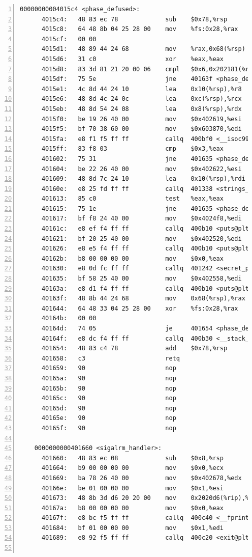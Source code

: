 \documentclass{article}
\begin{document}
\begin{lstlisting}[title = bomb的反汇编代码及部分注释, xleftmargin = 2em,xrightmargin = 2em, aboveskip = 1em, numbers = left, basicstyle=\scriptsize\ttfamily, numberstyle=\scriptsize]
    00000000004015c4 <phase_defused>:
      4015c4:	48 83 ec 78          	sub    $0x78,%rsp
      4015c8:	64 48 8b 04 25 28 00 	mov    %fs:0x28,%rax
      4015cf:	00 00 
      4015d1:	48 89 44 24 68       	mov    %rax,0x68(%rsp)
      4015d6:	31 c0                	xor    %eax,%eax
      4015d8:	83 3d 81 21 20 00 06 	cmpl   $0x6,0x202181(%rip)        # 603760 <num_input_strings>
      4015df:	75 5e                	jne    40163f <phase_defused+0x7b>
      4015e1:	4c 8d 44 24 10       	lea    0x10(%rsp),%r8
      4015e6:	48 8d 4c 24 0c       	lea    0xc(%rsp),%rcx
      4015eb:	48 8d 54 24 08       	lea    0x8(%rsp),%rdx
      4015f0:	be 19 26 40 00       	mov    $0x402619,%esi
      4015f5:	bf 70 38 60 00       	mov    $0x603870,%edi
      4015fa:	e8 f1 f5 ff ff       	callq  400bf0 <__isoc99_sscanf@plt>
      4015ff:	83 f8 03             	cmp    $0x3,%eax
      401602:	75 31                	jne    401635 <phase_defused+0x71>
      401604:	be 22 26 40 00       	mov    $0x402622,%esi
      401609:	48 8d 7c 24 10       	lea    0x10(%rsp),%rdi
      40160e:	e8 25 fd ff ff       	callq  401338 <strings_not_equal>
      401613:	85 c0                	test   %eax,%eax
      401615:	75 1e                	jne    401635 <phase_defused+0x71>
      401617:	bf f8 24 40 00       	mov    $0x4024f8,%edi
      40161c:	e8 ef f4 ff ff       	callq  400b10 <puts@plt>
      401621:	bf 20 25 40 00       	mov    $0x402520,%edi
      401626:	e8 e5 f4 ff ff       	callq  400b10 <puts@plt>
      40162b:	b8 00 00 00 00       	mov    $0x0,%eax
      401630:	e8 0d fc ff ff       	callq  401242 <secret_phase>
      401635:	bf 58 25 40 00       	mov    $0x402558,%edi
      40163a:	e8 d1 f4 ff ff       	callq  400b10 <puts@plt>
      40163f:	48 8b 44 24 68       	mov    0x68(%rsp),%rax
      401644:	64 48 33 04 25 28 00 	xor    %fs:0x28,%rax
      40164b:	00 00 
      40164d:	74 05                	je     401654 <phase_defused+0x90>
      40164f:	e8 dc f4 ff ff       	callq  400b30 <__stack_chk_fail@plt>
      401654:	48 83 c4 78          	add    $0x78,%rsp
      401658:	c3                   	retq   
      401659:	90                   	nop
      40165a:	90                   	nop
      40165b:	90                   	nop
      40165c:	90                   	nop
      40165d:	90                   	nop
      40165e:	90                   	nop
      40165f:	90                   	nop
    
    0000000000401660 <sigalrm_handler>:
      401660:	48 83 ec 08          	sub    $0x8,%rsp
      401664:	b9 00 00 00 00       	mov    $0x0,%ecx
      401669:	ba 78 26 40 00       	mov    $0x402678,%edx
      40166e:	be 01 00 00 00       	mov    $0x1,%esi
      401673:	48 8b 3d d6 20 20 00 	mov    0x2020d6(%rip),%rdi        # 603750 <stderr@@GLIBC_2.2.5>
      40167a:	b8 00 00 00 00       	mov    $0x0,%eax
      40167f:	e8 bc f5 ff ff       	callq  400c40 <__fprintf_chk@plt>
      401684:	bf 01 00 00 00       	mov    $0x1,%edi
      401689:	e8 92 f5 ff ff       	callq  400c20 <exit@plt>
    

\end{lstlisting}
\end{document}
